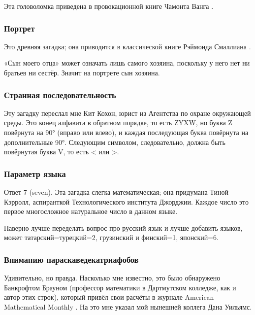 Эта головоломка приведена в провокационной книге Чамонта Ванга \cite{58}.

\subsubsection*{Портрет}

Это древняя загадка;
она приводится в классической книге Рэймонда Смаллиана \cite{55}.

«Сын моего отца» может означать лишь самого хозяина, поскольку у него нет ни братьев ни сестёр.
Значит на портрете сын хозяина.

\subsubsection*{Странная последовательность}

Эту загадку переслал мне Кит Кохон, юрист из Агентства по охране окружающей среды.
Это конец алфавита в обратном порядке, то есть ZYXW, но буква Z повёрнута на 90° (вправо или влево), и каждая последующая буква повёрнута на дополнительные 90°.
Следующим символом, следовательно, должна быть повёрнутая буква V, то есть < или >.

\subsubsection*{Параметр языка}

Ответ 7 (seven).
Эта загадка слегка математическая;
она придумана Тиной Кэрролл, аспиранткой Технологического института Джорджии. 
Каждое число это первое многосложное натуральное число в данном языке.

\begin{addedbytheeditors}
Наверно лучше переделать вопрос про русский язык и лучше добавить языков, может татарский=турецкий=2, грузинский и финский=1, японский=6.
\end{addedbytheeditors}


\subsubsection*{Вниманию параскаведекатриафобов}

Удивительно, но правда.
Насколько мне известно, это было обнаружено Банкрофтом Брауном (профессор математики в Дартмутском колледже, как и автор этих строк), который привёл свои расчёты в журнале American Mathematical Monthly \cite{11}.
На это мне указал мой нынешней коллега Дана Уильямс.

